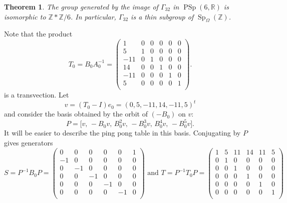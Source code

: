 \documentclass[11pt]{article}
\newtheorem{theorem}{Theorem}
\DeclareMathOperator{\Sp}{Sp}
\DeclareMathOperator{\PSp}{PSp}
\newcommand{\ZZ}{\mathbb{Z}}
\newcommand{\RR}{\mathbb{R}}
\begin{document}
\begin{theorem}
    The group generated by the image of $\Gamma_{32}$ in $\PSp(6,\RR)$ is isomorphic to $\ZZ \ast \ZZ/6$.
    In particular, $\Gamma_{32}$ is a thin subgroup of $\Sp_\Omega(\ZZ)$. 
\end{theorem}

Note that the product
\begin{equation*}
  T_0=B_0A_0^{-1} = \left(
\begin{array}{cccccc}
 1 & 0 & 0 & 0 & 0 & 0 \\
 5 & 1 & 0 & 0 & 0 & 0 \\
 -11 & 0 & 1 & 0 & 0 & 0 \\
 14 & 0 & 0 & 1 & 0 & 0 \\
 -11 & 0 & 0 & 0 & 1 & 0 \\
 5 & 0 & 0 & 0 & 0 & 1 \\
\end{array}
\right).
\end{equation*}
is a transvection.  Let
\begin{equation*}
  v=(T_0-I)e_0=(0,5,-11,14,-11,5)^t
\end{equation*}
and consider the basis obtained by the orbit of $(-B_0)$ on $v$: 
\begin{equation*}
  P=\bigl[v,\,-B_0v,\,B_0^2v,\,-B_0^3v,\,B_0^4v,\,-B_0^5v\bigr].
\end{equation*}
It will be easier to describe the ping pong table in this basis.
Conjugating by $P$ gives generators 
    \[ S=P^{-1}B_0P = \left(
\begin{array}{cccccc}
 0 & 0 & 0 & 0 & 0 & 1 \\
 -1 & 0 & 0 & 0 & 0 & 0 \\
 0 & -1 & 0 & 0 & 0 & 0 \\
 0 & 0 & -1 & 0 & 0 & 0 \\
 0 & 0 & 0 & -1 & 0 & 0 \\
 0 & 0 & 0 & 0 & -1 & 0 \\
\end{array}
\right) \text{ and } T=P^{-1}T_0P  = \left(
\begin{array}{cccccc}
 1 & 5 & 11 & 14 & 11 & 5 \\
 0 & 1 & 0 & 0 & 0 & 0 \\
 0 & 0 & 1 & 0 & 0 & 0 \\
 0 & 0 & 0 & 1 & 0 & 0 \\
 0 & 0 & 0 & 0 & 1 & 0 \\
 0 & 0 & 0 & 0 & 0 & 1 \\
\end{array}
\right) \]
\end{document}
